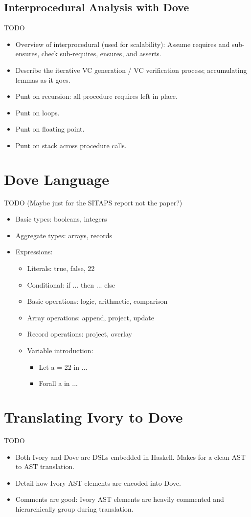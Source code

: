\documentclass{article}
\begin{document}
\subsection{Interprocedural Analysis with Dove}
TODO
\begin{itemize}
  \item Overview of interprocedural (used for scalability): Assume requires and sub-ensures, check sub-requires, ensures, and asserts.
  \item Describe the iterative VC generation / VC verification process; accumulating lemmas as it goes.
  \item Punt on recursion: all procedure requires left in place.
  \item Punt on loops.
  \item Punt on floating point.
  \item Punt on stack across procedure calls.
\end{itemize}

\section{Dove Language}
TODO
(Maybe just for the SITAPS report not the paper?)
\begin{itemize}
  \item Basic types: booleans, integers
  \item Aggregate types: arrays, records
  \item Expressions:
  \begin{itemize}
    \item Literals: true, false, 22
    \item Conditional: if ... then ... else
    \item Basic operations: logic, arithmetic, comparison
    \item Array operations: append, project, update
    \item Record operations: project, overlay
    \item Variable introduction:
    \begin{itemize}
      \item Let a = 22 in ...
      \item Forall a in ...
    \end{itemize}
  \end{itemize}
\end{itemize}

\section{Translating Ivory to Dove}
TODO
\begin{itemize}
  \item Both Ivory and Dove are DSLs embedded in Haskell.  Makes for a clean AST to AST translation.
  \item Detail how Ivory AST elements are encoded into Dove.
  \item Comments are good: Ivory AST elements are heavily commented and hierarchically group during translation.
\end{itemize}
\end{document}

